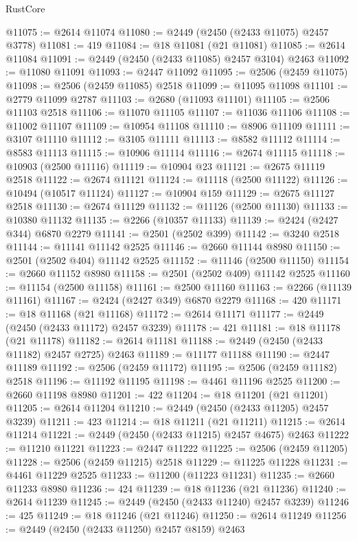 \begin{lexlean}{RustCore}
\begin{coremodule}
@11075 := @2614 @11074
@11080 := @2449 (@2450 (@2433 @11075) @2457 @3778)
@11081 := 419
@11084 := @18 @11081 (@21 @11081)
@11085 := @2614 @11084
@11091 := @2449 (@2450 (@2433 @11085) @2457 @3104) @2463
@11092 := @11080 @11091
@11093 := @2447 @11092
@11095 := @2506 (@2459 @11075)
@11098 := @2506 (@2459 @11085) @2518
@11099 := @11095 @11098
@11101 := @2779 @11099 @2787
@11103 := @2680 (@11093 @11101)
@11105 := @2506 @11103 @2518
@11106 := @11070 @11105
@11107 := @11036 @11106
@11108 := @11002 @11107
@11109 := @10954 @11108
@11110 := @8906 @11109
@11111 := @3107 @11110
@11112 := @3105 @11111
@11113 := @8582 @11112
@11114 := @8583 @11113
@11115 := @10906 @11114
@11116 := @2674 @11115
@11118 := @10903 (@2500 @11116)
@11119 := @10904 @23
@11121 := @2675 @11119 @2518
@11122 := @2674 @11121
@11124 := @11118 (@2500 @11122)
@11126 := @10494 (@10517 @11124)
@11127 := @10904 @159
@11129 := @2675 @11127 @2518
@11130 := @2674 @11129
@11132 := @11126 (@2500 @11130)
@11133 := @10380 @11132
@11135 := @2266 (@10357 @11133)
@11139 := @2424 (@2427 @344) @6870 @2279
@11141 := @2501 (@2502 @399)
@11142 := @3240 @2518
@11144 := @11141 @11142 @2525
@11146 := @2660 @11144 @8980
@11150 := @2501 (@2502 @404) @11142 @2525
@11152 := @11146 (@2500 @11150)
@11154 := @2660 @11152 @8980
@11158 := @2501 (@2502 @409) @11142 @2525
@11160 := @11154 (@2500 @11158)
@11161 := @2500 @11160
@11163 := @2266 (@11139 @11161)
@11167 := @2424 (@2427 @349) @6870 @2279
@11168 := 420
@11171 := @18 @11168 (@21 @11168)
@11172 := @2614 @11171
@11177 := @2449 (@2450 (@2433 @11172) @2457 @3239)
@11178 := 421
@11181 := @18 @11178 (@21 @11178)
@11182 := @2614 @11181
@11188 := @2449 (@2450 (@2433 @11182) @2457 @2725) @2463
@11189 := @11177 @11188
@11190 := @2447 @11189
@11192 := @2506 (@2459 @11172)
@11195 := @2506 (@2459 @11182) @2518
@11196 := @11192 @11195
@11198 := @4461 @11196 @2525
@11200 := @2660 @11198 @8980
@11201 := 422
@11204 := @18 @11201 (@21 @11201)
@11205 := @2614 @11204
@11210 := @2449 (@2450 (@2433 @11205) @2457 @3239)
@11211 := 423
@11214 := @18 @11211 (@21 @11211)
@11215 := @2614 @11214
@11221 := @2449 (@2450 (@2433 @11215) @2457 @4675) @2463
@11222 := @11210 @11221
@11223 := @2447 @11222
@11225 := @2506 (@2459 @11205)
@11228 := @2506 (@2459 @11215) @2518
@11229 := @11225 @11228
@11231 := @4461 @11229 @2525
@11233 := @11200 (@11223 @11231)
@11235 := @2660 @11233 @8980
@11236 := 424
@11239 := @18 @11236 (@21 @11236)
@11240 := @2614 @11239
@11245 := @2449 (@2450 (@2433 @11240) @2457 @3239)
@11246 := 425
@11249 := @18 @11246 (@21 @11246)
@11250 := @2614 @11249
@11256 := @2449 (@2450 (@2433 @11250) @2457 @8159) @2463

\end{coremodule}
\end{lexlean}

